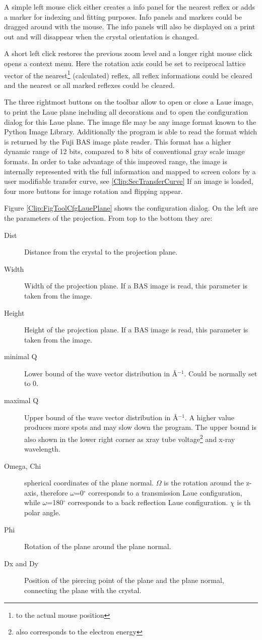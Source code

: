 A simple left mouse click either creates a info panel for the nearest
reflex or adds a marker for indexing and fitting purposes. Info panels
and markers could be dragged around with the mouse. The info panels
will also be displayed on a print out and will disappear when the
crystal orientation is changed.

A short left click restores the previous zoom level and a
longer right mouse click opens a context menu. Here the rotation axis
could be set to reciprocal lattice vector of the nearest\footnote{to
  the actual mouse position} (calculated) reflex, all reflex informations
could be cleared and the nearest or all marked reflexes could be
cleared.

The three rightmost buttons on the toolbar allow to open or close a
Laue image, to print the Laue plane including all decorations and to
open the configuration dialog for this Laue plane. The image file may be
any image format known to the Python Image Library. Additionally the
program is able to read the format which is returned by the Fuji BAS
image plate reader. This format has a higher dynamic range of 12 bits,
compared to 8 bits of conventional gray scale image formats. In order to take
advantage of this improved range, the image is internally represented
with the full information and mapped to screen colors by a user
modifiable transfer curve, see \ref{Clip:SecTransferCurve}
If an image is loaded, four more buttons for image rotation and
flipping appear. 


Figure \ref{Clip:FigToolCfgLauePlane} shows the configuration
dialog. On the left are the parameters of the projection. From top to
the bottom they are:

\begin{description}
\item[Dist] Distance from the crystal to the projection plane.
\item[Width] Width of the projection plane. If a BAS image is read,
  this parameter is taken from the image.
\item[Height] Height of the projection plane. If a BAS image is read,
  this parameter is taken from the image.
\item[minimal Q] Lower bound of the wave vector distribution in
  \AA$^{-1}$. Could be normally set to 0.
\item[maximal Q] Upper bound of the wave vector distribution in
  \AA$^{-1}$. A higher value produces more spots and may slow down the
  program. The upper bound is also shown in the lower right corner as
  xray tube voltage\footnote{also corresponds to the electron energy}
  and x-ray wavelength.
\item[Omega, Chi] spherical coordinates of the plane normal. $\Omega$
  is the rotation around  the z-axis, therefore $\omega$=0$^\circ$
  corresponds to a transmission Laue configuration, while
  $\omega$=180$^\circ$ corresponds to a back reflection Laue
  configuration. $\chi$ is th polar angle.
\item[Phi] Rotation of the plane around the plane normal.
\item[Dx and Dy] Position of the piercing point of the plane and the
  plane normal, connecting the plane with the crystal.
\end{description}


